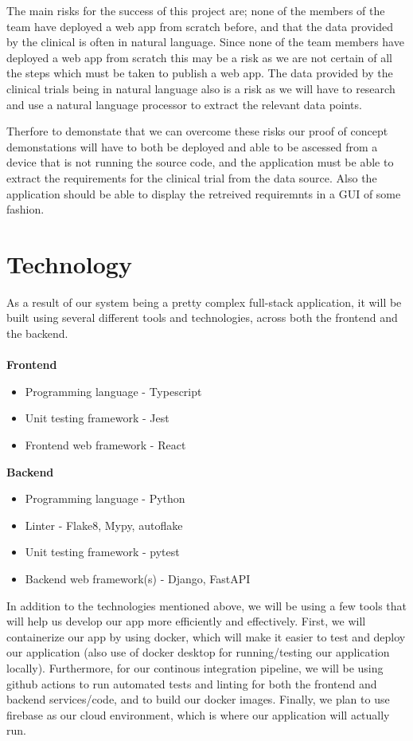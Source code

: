 \documentclass{article}
\begin{document}
The main risks for the success of this project are; none of the members of the team have deployed a web app from scratch before, and that the data provided by the clinical is often in natural language. Since none of the team members have deployed a web app from scratch this may be a risk as we are not certain of all the steps which must be taken to publish a web app. The data provided by the clinical trials being in natural language also is a risk as we will have to research and use a natural language processor to extract the relevant data points. 

Therfore to demonstate that we can overcome these risks our proof of concept demonstations will have to both be deployed and able to be ascessed from a device that is not running the source code, and the application must be able to extract the requirements for the clinical trial from the data source. Also the application should be able to display the retreived requiremnts in a GUI of some fashion.

\section{Technology}

As a result of our system being a pretty complex full-stack application, it will be built
using several different tools and technologies, across both the frontend and the backend.
\\~\\
\textbf{Frontend}

\begin{itemize}
	\item Programming language - Typescript
	\item Unit testing framework - Jest
	\item Frontend web framework - React\\
\end{itemize}

\textbf{Backend}

\begin{itemize}
	\item Programming language - Python
	\item Linter - Flake8, Mypy, autoflake
	\item Unit testing framework - pytest
	\item Backend web framework(s) - Django, FastAPI\\
\end{itemize}

In addition to the technologies mentioned above, we will be using a few tools that will help us 
develop our app more efficiently and effectively. First, we will containerize our app
by using docker, which will make it easier to test and deploy our application (also use of docker desktop for running/testing
our application locally). Furthermore, for our continous 
integration pipeline, we will be using github actions to run automated tests and linting for both the frontend and backend 
services/code, and to build our docker images. Finally, we plan to use firebase as our cloud environment, which
is where our application will actually run. \\
\end{document}
